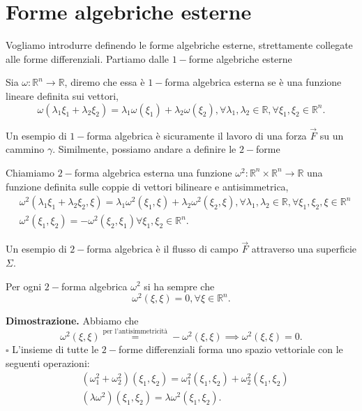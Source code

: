 \section{Forme algebriche esterne}
Vogliamo introdurre definendo le forme algebriche esterne, strettamente collegate alle forme differenziali. Partiamo dalle $1-$forme algebriche esterne
%
\vspace{0.5cm}
\begin{definition}
    Sia $\omega : \mathbb{R}^n \to \mathbb{R}$, diremo che essa è $1-$forma algebrica esterna se è una funzione lineare definita sui vettori,
    $$
    \omega(\lambda_1 \xi_1 + \lambda_2 \xi_2) = \lambda_1 \omega(\xi_1) + \lambda_2 \omega(\xi_2), \forall \lambda_1, \lambda_2 \in \mathbb{R}, \forall \xi_1, \xi_2 \in \mathbb{R}^n.
    $$
\end{definition}
%
Un esempio di $1-$forma algebrica è sicuramente il lavoro di una forza $\vec{F}$ su un cammino $\gamma$. Similmente, possiamo andare a definire le $2-$forme
%
\vspace{0.5cm}
\begin{definition}
    Chiamiamo $2-$forma algebrica esterna una funzione $\omega^2: \mathbb{R}^n \times \mathbb{R}^n \to \mathbb{R}$ una funzione definita sulle coppie di vettori bilineare e antisimmetrica,
    \[\begin{aligned}
        &\omega^2(\lambda_1 \xi_1 + \lambda_2 \xi_2, \xi) = \lambda_1 \omega^2(\xi_1, \xi) + \lambda_2 \omega^2(\xi_2, \xi), \forall \lambda_1, \lambda_2 \in \mathbb{R}, \forall \xi_1, \xi_2, \xi \in \mathbb{R}^n \\
        &\omega^2(\xi_1, \xi_2) = - \omega^2(\xi_2, \xi_1) \forall \xi_1, \xi_2 \in \mathbb{R}^n.
    \end{aligned}\]
\end{definition}
%
Un esempio di $2-$forma algebrica è il flusso di campo $\vec{F}$ attraverso una superficie $\Sigma$.
%
\vspace{0.5cm}
\begin{prop}
    Per ogni $2-$forma algebrica $\omega^2$ si ha sempre che
    $$
    \omega^2(\xi, \xi) = 0, \forall \xi \in \mathbb{R}^n.
    $$
\end{prop}
%
\noindent \textbf{Dimostrazione. }
    Abbiamo che
    $$
    \omega^2(\xi, \xi) \stackrel{\text{per l'antisimmetricità}}{=} - \omega^2(\xi, \xi) \implies \omega^2(\xi, \xi) = 0.
    $$
\hfill $\square$
%
L'insieme di tutte le $2-$forme differenziali forma uno spazio vettoriale con le seguenti operazioni:
\[\begin{aligned}
    &(\omega_1^2 + \omega_2^2)(\xi_1, \xi_2) = \omega_1^2(\xi_1, \xi_2) + \omega_2^2(\xi_1, \xi_2) \\
    &(\lambda \omega^2)(\xi_1, \xi_2) = \lambda \omega^2(\xi_1, \xi_2).
\end{aligned}\]
